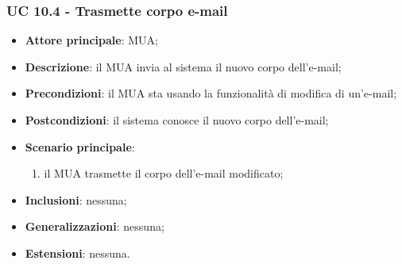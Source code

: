     \subsubsection{UC 10.4 - Trasmette corpo e-mail} \label{sec:UC10.4}
    \begin{itemize}
        \item \textbf{Attore principale}: MUA;
        \item \textbf{Descrizione}: il MUA invia al sistema il nuovo corpo dell'e-mail;
        \item \textbf{Precondizioni}: il MUA sta usando la funzionalità di modifica di un'e-mail;
        \item \textbf{Postcondizioni}: il sistema conosce il nuovo corpo dell'e-mail;
        \item \textbf{Scenario principale}:
            \begin{enumerate}
                \item il MUA trasmette il corpo dell'e-mail modificato;
            \end{enumerate}
        \item \textbf{Inclusioni}: nessuna;
        \item \textbf{Generalizzazioni}: nessuna;
        \item \textbf{Estensioni}: nessuna.
    \end{itemize}


